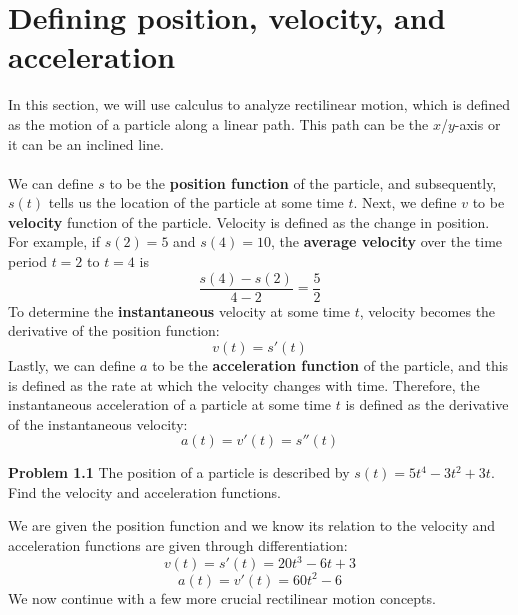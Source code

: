 \documentclass[11pt]{scrartcl}
\begin{document}
\maketitle
\noindent

\section{Defining position, velocity, and acceleration}
\noindent
In this section, we will use calculus to analyze rectilinear motion, which is defined as the motion of a particle along a linear path. This path can be the $x$/$y$-axis or it can be an inclined line. \\
\\
\noindent 
We can define $s$ to be the \textbf{position function} of the particle, and subsequently, $s(t)$ tells us the location of the particle at some time $t$. Next, we define $v$ to be \textbf{velocity} function of the particle. Velocity is defined as the change in position. For example, if $s(2)=5$ and $s(4)=10$, the \textbf{average velocity} over the time period $t=2$ to $t=4$ is 
$$\frac{s(4)-s(2)}{4-2}=\frac{5}{2}$$
To determine the \textbf{instantaneous} velocity at some time $t$, velocity becomes the derivative of the position function: 
$$v(t)=s'(t)$$
Lastly, we can define $a$ to be the \textbf{acceleration function} of the particle, and this is defined as the rate at which the velocity changes with time. Therefore, the instantaneous acceleration of a particle at some time $t$ is defined as the derivative of the instantaneous velocity: 
$$a(t)=v'(t)=s''(t)$$
\begin{tcolorbox}
[colback=purple!5!white,colframe=purple!75!black]
\textbf{Problem 1.1} The position of a particle is described by $s(t)=5t^4-3t^2+3t$. Find the velocity and acceleration functions. 
\end{tcolorbox}
\noindent 
We are given the position function and we know its relation to the velocity and acceleration functions are given through differentiation: 
$$v(t)=s'(t)=20t^3-6t+3$$
$$a(t)=v'(t)=60t^2-6$$
We now continue with a few more crucial rectilinear motion concepts. 
\end{document}
